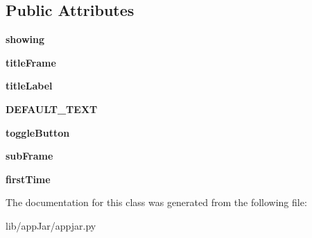 \subsection*{Public Attributes}
\begin{DoxyCompactItemize}
\item 
\mbox{\label{classappjar_1_1_toggle_frame_ab04409362d30925f19acb40c731e2dc4}} 
{\bfseries showing}
\item 
\mbox{\label{classappjar_1_1_toggle_frame_ae2b3345289141d361ee4a0cae3763d98}} 
{\bfseries title\+Frame}
\item 
\mbox{\label{classappjar_1_1_toggle_frame_a56809b0f1334d182a2ffac64312acabe}} 
{\bfseries title\+Label}
\item 
\mbox{\label{classappjar_1_1_toggle_frame_ab17549e0787aaca788f5a069013f670b}} 
{\bfseries D\+E\+F\+A\+U\+L\+T\+\_\+\+T\+E\+XT}
\item 
\mbox{\label{classappjar_1_1_toggle_frame_aeda38352ab8073a3b8b2d52b63522913}} 
{\bfseries toggle\+Button}
\item 
\mbox{\label{classappjar_1_1_toggle_frame_a141f722e52f0329ad2e0d31a06f00297}} 
{\bfseries sub\+Frame}
\item 
\mbox{\label{classappjar_1_1_toggle_frame_a4e1131de5bec7fd51d4147fdf1cfc469}} 
{\bfseries first\+Time}
\end{DoxyCompactItemize}


The documentation for this class was generated from the following file\+:\begin{DoxyCompactItemize}
\item 
lib/app\+Jar/appjar.\+py\end{DoxyCompactItemize}
